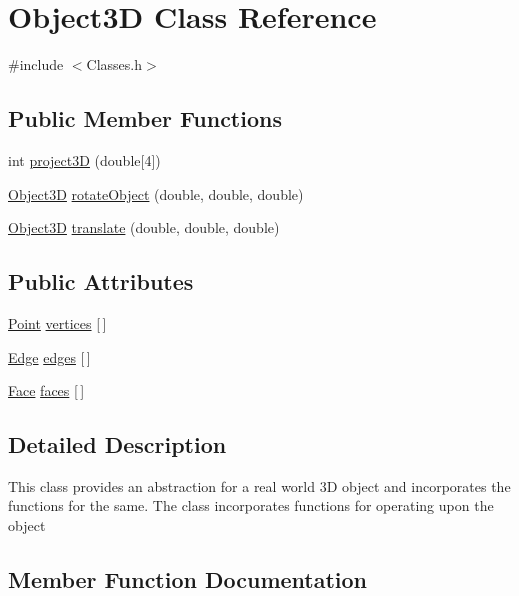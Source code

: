 \hypertarget{class_object3_d}{}\section{Object3D Class Reference}
\label{class_object3_d}


{\ttfamily \#include $<$Classes.\+h$>$}

\subsection*{Public Member Functions}
\begin{DoxyCompactItemize}
\item 
int \hyperlink{class_object3_d_a17e177a936a71e0a5599ce7ca76bae78}{project3D} (double\mbox{[}4\mbox{]})
\item 
\hyperlink{class_object3_d}{Object3D} \hyperlink{class_object3_d_a476b3de610cb30be0b050b4701ba4701}{rotate\+Object} (double, double, double)
\item 
\hyperlink{class_object3_d}{Object3D} \hyperlink{class_object3_d_afb299c53794e9f4fb708efbde24c9a21}{translate} (double, double, double)
\end{DoxyCompactItemize}
\subsection*{Public Attributes}
\begin{DoxyCompactItemize}
\item 
\hyperlink{class_point}{Point} \hyperlink{class_object3_d_a23cc82ea4ef0af8e0e22871bdbdba6c6}{vertices} \mbox{[}$\,$\mbox{]}
\item 
\hyperlink{class_edge}{Edge} \hyperlink{class_object3_d_ad93f210748663a4d0aaa89287dee3dae}{edges} \mbox{[}$\,$\mbox{]}
\item 
\hyperlink{class_face}{Face} \hyperlink{class_object3_d_a4cc7f57059a990a8573a7644a4d3ab2a}{faces} \mbox{[}$\,$\mbox{]}
\end{DoxyCompactItemize}


\subsection{Detailed Description}
This class provides an abstraction for a real world 3D object and incorporates the functions for the same. The class incorporates functions for operating upon the object 

\subsection{Member Function Documentation}
